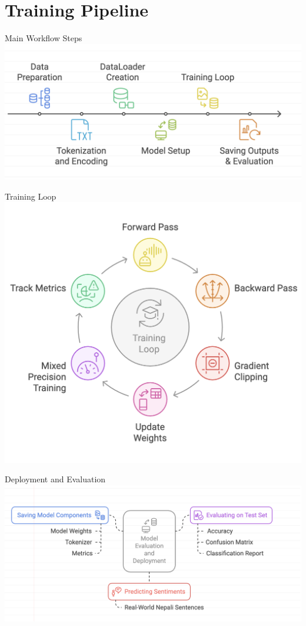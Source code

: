 \documentclass[aspectratio=169]{beamer}
\begin{document}
\section{Training Pipeline}
\begin{frame}{Main Workflow Steps}
  \centering
  \includegraphics[width=0.95\linewidth]{workflow.png}
\end{frame}

\begin{frame}{Training Loop}
  \centering
  \includegraphics[width=0.75\linewidth]{trainLoop.png}
\end{frame}

\begin{frame}{Deployment and Evaluation}
  \centering
  \includegraphics[width=0.95\linewidth]{deployment.png}
\end{frame}
\end{document}
